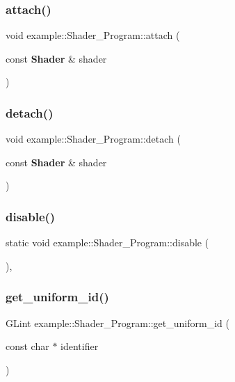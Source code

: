 \subsubsection{attach()}
{\footnotesize\ttfamily void example\+::\+Shader\+\_\+\+Program\+::attach (\begin{DoxyParamCaption}\item[{const \textbf{ Shader} \&}]{shader }\end{DoxyParamCaption})\hspace{0.3cm}{\ttfamily [inline]}}

\mbox{\label{classexample_1_1_shader___program_a83c1ac06873858589f454c5dfaa7b00c}} 
\subsubsection{detach()}
{\footnotesize\ttfamily void example\+::\+Shader\+\_\+\+Program\+::detach (\begin{DoxyParamCaption}\item[{const \textbf{ Shader} \&}]{shader }\end{DoxyParamCaption})\hspace{0.3cm}{\ttfamily [inline]}}

\mbox{\label{classexample_1_1_shader___program_a1fe0129a78e4bf33fd07de4448e3657b}} 
\subsubsection{disable()}
{\footnotesize\ttfamily static void example\+::\+Shader\+\_\+\+Program\+::disable (\begin{DoxyParamCaption}{ }\end{DoxyParamCaption})\hspace{0.3cm}{\ttfamily [inline]}, {\ttfamily [static]}}

\mbox{\label{classexample_1_1_shader___program_a03a790d8c22cbe1d6b0c9a1857a13a0e}} 
\subsubsection{get\_uniform\_id()}
{\footnotesize\ttfamily G\+Lint example\+::\+Shader\+\_\+\+Program\+::get\+\_\+uniform\+\_\+id (\begin{DoxyParamCaption}\item[{const char $\ast$}]{identifier }\end{DoxyParamCaption})\hspace{0.3cm}{\ttfamily [inline]}}

